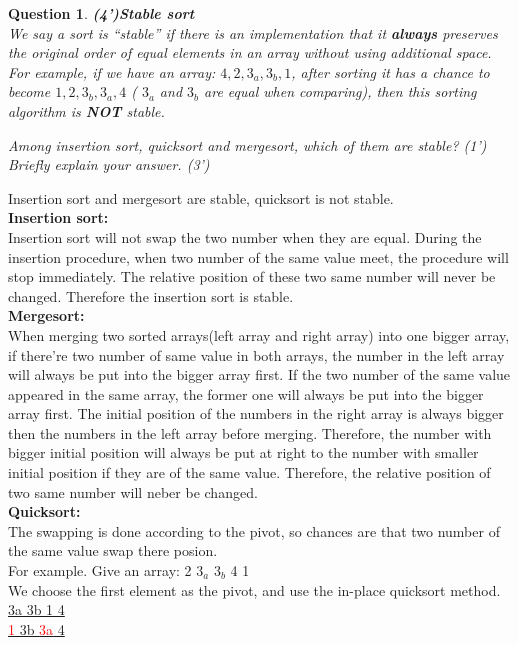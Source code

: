 \documentclass[10.5pt]{article}
\newcommand{\redtext}[1]{\textcolor{red}{#1}}
\newtheorem{Q}{Question}
\begin{document}
	\begin{Q}\textbf{(4')Stable sort}\\
        We say a sort is ``stable'' if there is an implementation that it \textbf{always} preserves the original order of equal elements in an array without using additional space. For example, if we have an array: $4, 2, 3_a, 3_b, 1$, after sorting it has a chance to become $1, 2, 3_b, 3_a, 4$ ( $3_a$ and $3_b$ are equal when comparing), then this sorting algorithm is \textbf{NOT} stable.
        
        Among insertion sort, quicksort and mergesort, which of them are stable? (1') Briefly explain your answer. (3')
	\end{Q}

	Insertion sort and mergesort are stable, quicksort is not stable.\\
	\textbf{Insertion sort:}\\
	Insertion sort will not swap the two number when they are equal. During the insertion procedure, when two number of the same value meet, the procedure will stop immediately. The relative position of these two same number will never be changed. Therefore the insertion sort is stable.\\
	\textbf{Mergesort:}\\
	When merging two sorted arrays(left array and right array) into one bigger array, if there're two number of same value in both arrays, the number in the left array will always be put into the bigger array first. If the two number of the same value appeared in the same array, the former one will always be put into the bigger array first. The initial position of the numbers in the right array is always bigger then the numbers in the left array before merging. Therefore, the number with bigger initial position will always be put at right to the number with smaller initial position if they are of the same value. Therefore, the relative position of two same number will neber be changed.\\
	\textbf{Quicksort:}\\
	The swapping is done according to the pivot, so chances are that two number of the same value swap there posion.\\
	For example. Give an array: 
	2 3$_a$ 3$_b$ 4 1\\
	We choose the first element as the pivot, and use the in-place quicksort method.\\
	\underline{ 3a 3b 1 4}\\
	\underline{ \redtext{1} 3b  \redtext{3a} 4}\\
\end{document}
